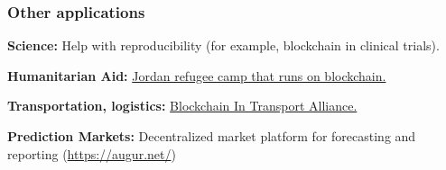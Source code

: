 \documentclass{beamer}
\begin{document}
\begin{frame}
  \frametitle{Other applications}
  
  \begin{block}{\textbf{Science:}}
  Help with reproducibility (for example, blockchain in clinical trials).
   \end{block}
 	
 	 	\pause
 	
     \begin{block}{\textbf{Humanitarian Aid:}}
  \href{https://www.technologyreview.com/2018/04/12/143410/inside-the-jordan-refugee-camp-that-runs-on-blockchain/}{Jordan refugee camp that runs on blockchain.}
 	\end{block} 	
 	
 	\pause
 	
     \begin{block}{\textbf{Transportation, logistics:}}
  \href{https://www.bita.studio/}{Blockchain In Transport Alliance.}
 	\end{block} 		
 	
 	\pause
     \begin{block}{\textbf{Prediction Markets:}}
  Decentralized market platform for forecasting and reporting (\url{https://augur.net/})
 	\end{block}
\end{frame}


\end{document}
